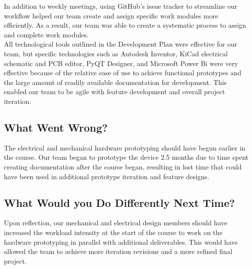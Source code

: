 \documentclass[12pt,titlepage]{article}
\begin{document}
In addition to weekly meetings, using GitHub's issue tracker to streamline our workflow helped our team create and assign specific work modules more efficiently. As a result, our team was able to create a systematic process to assign and complete work modules. \\

All technological tools outlined in the Development Plan were effective for our team, but specific technologies such as Autodesk Inventor, KiCad electrical schematic and PCB editor, PyQT Designer, and Microsoft Power Bi were very effective because of the relative ease of use to achieve functional prototypes and the large amount of readily available documentation for development. This enabled our team to be agile with feature development and overall project iteration. 

\subsection{What Went Wrong?}


The electrical and mechanical hardware prototyping should have begun earlier in the course. Our team began to prototype the device 2.5 months due to time spent creating documentation after the course began, resulting in lost time that could have been used in additional prototype iteration and feature designs. 

\subsection{What Would you Do Differently Next Time?}


Upon reflection, our mechanical and electrical design members should have increased the workload intensity at the start of the course to work on the hardware prototyping in parallel with additional deliverables. This would have allowed the team to achieve more iteration revisions and a more refined final project. \\
\end{document}
